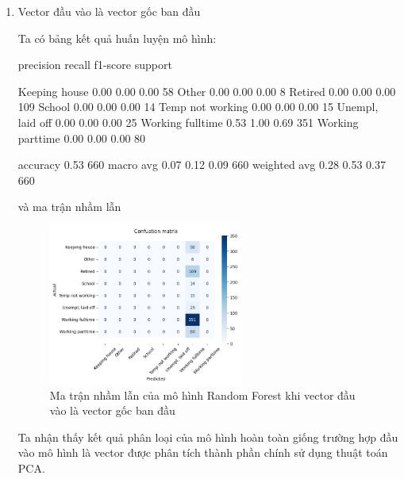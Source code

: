 \begin{enumerate}[label=(\alph*)]
    \item Vector đầu vào là vector gốc ban đầu
    
    Ta có bảng kết quả huấn luyện mô hình:

    \begin{python}
                    precision    recall  f1-score   support

   Keeping house       0.00      0.00      0.00        58
           Other       0.00      0.00      0.00         8
         Retired       0.00      0.00      0.00       109
          School       0.00      0.00      0.00        14
Temp not working       0.00      0.00      0.00        15
Unempl, laid off       0.00      0.00      0.00        25
Working fulltime       0.53      1.00      0.69       351
Working parttime       0.00      0.00      0.00        80

        accuracy                           0.53       660
       macro avg       0.07      0.12      0.09       660
    weighted avg       0.28      0.53      0.37       660

    \end{python}

    và ma trận nhầm lẫn

    \begin{figure}[H]
        \centering
        \includegraphics[width=0.6\textwidth]{figures/Thanh/Models/Random_Forest/Non_null_models_confusion_matrix_Random_Forest_PCA_features.png}
        \caption{Ma trận nhầm lẫn của mô hình Random Forest khi vector đầu vào là vector gốc ban đầu}
        \label{fig:Non_null_models_confusion_matrix_Random_Forest_PCA_features}
    \end{figure}
    
    Ta nhận thấy kết quả phân loại của mô hình hoàn toàn giống trường hợp đầu vào mô hình là vector được phân tích thành phần chính sử dụng thuật toán PCA.


\end{enumerate}
